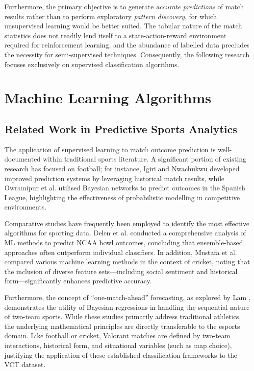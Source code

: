 Furthermore, the primary objective is to generate \textit{accurate predictions} of match results rather than to perform exploratory \textit{pattern discovery}, for which unsupervised learning would be better suited. The tabular nature of the match statistics does not readily lend itself to a state-action-reward environment required for reinforcement learning, and the abundance of labelled data precludes the necessity for semi-supervised techniques. Consequently, the following research focuses exclusively on supervised classification algorithms.

\section{Machine Learning Algorithms}

\subsection{Related Work in Predictive Sports Analytics}
The application of supervised learning to match outcome prediction is well-documented within traditional sports literature. A significant portion of existing research has focused on football; for instance, Igiri and Nwachukwu \cite{igiri2014improved} developed improved prediction systems by leveraging historical match results, while Owramipur et al. \cite{owramipur2013football} utilised Bayesian networks to predict outcomes in the Spanish League, highlighting the effectiveness of probabilistic modelling in competitive environments.

Comparative studies have frequently been employed to identify the most effective algorithms for sporting data. Delen et al. \cite{delen2012comparative} conducted a comprehensive analysis of ML methods to predict NCAA bowl outcomes, concluding that ensemble-based approaches often outperform individual classifiers. In addition, Mustafa et al. \cite{mustafa2017predicting} compared various machine learning methods in the context of cricket, noting that the inclusion of diverse feature sets---including social sentiment and historical form---significantly enhances predictive accuracy.

Furthermore, the concept of ``one-match-ahead'' forecasting, as explored by Lam \cite{lam2018one}, demonstrates the utility of Bayesian regressions in handling the sequential nature of two-team sports. While these studies primarily address traditional athletics, the underlying mathematical principles are directly transferable to the esports domain. Like football or cricket, Valorant matches are defined by two-team interactions, historical form, and situational variables (such as map choice), justifying the application of these established classification frameworks to the VCT dataset.

